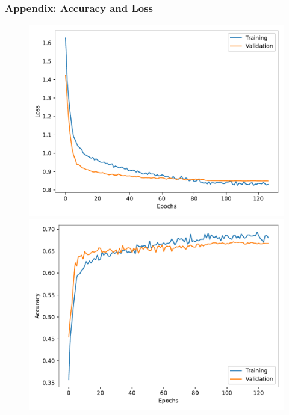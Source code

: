 \documentclass[8pt]{beamer}
\begin{document}
\appendix
\begin{frame}
    \frametitle{Appendix: Accuracy and Loss}
    \begin{figure}
        \begin{minipage}[b]{0.48\textwidth}
            \centering
            \includegraphics[width=\textwidth]{figures/Loss.pdf}
        \end{minipage}
        \hfill
        \begin{minipage}[b]{0.48\textwidth}
            \centering
            \includegraphics[width=\textwidth]{figures/Acc.pdf}
        \end{minipage}
    \end{figure}
\end{frame}
\end{document}
